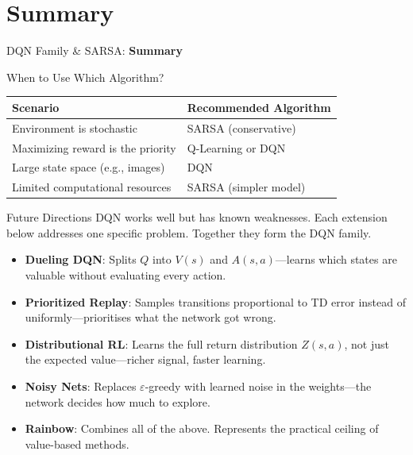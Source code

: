 \section{Summary}
\begin{frame}{}
    \LARGE DQN Family \& SARSA: \textbf{Summary}
\end{frame}

\begin{frame}{When to Use Which Algorithm?}
    \begin{table}[]
        \centering
        \renewcommand{\arraystretch}{2.5}
        \begin{tabular}{ll}
            \hline
            \textbf{Scenario} & \textbf{Recommended Algorithm} \\ \hline
            Environment is stochastic & SARSA (conservative) \\ 
            Maximizing reward is the priority & Q-Learning or DQN \\ 
            Large state space (e.g., images) & DQN \\ 
            Limited computational resources & SARSA (simpler model) \\ \hline
        \end{tabular}
    \end{table}
\end{frame}

\begin{frame}{Future Directions}
    \small
    DQN works well but has known weaknesses. Each extension below addresses one specific problem. Together they form the DQN family.
    \begin{itemize}
        \setlength{\itemsep}{0.4em}
        \item \textbf{Dueling DQN}: Splits $Q$ into $V(s)$ and $A(s,a)$---learns which states are valuable without evaluating every action.
        \item \textbf{Prioritized Replay}: Samples transitions proportional to TD error instead of uniformly---prioritises what the network got wrong.
        \item \textbf{Distributional RL}: Learns the full return distribution $Z(s,a)$, not just the expected value---richer signal, faster learning.
        \item \textbf{Noisy Nets}: Replaces $\varepsilon$-greedy with learned noise in the weights---the network decides how much to explore.
        \item \textbf{Rainbow}: Combines all of the above. Represents the practical ceiling of value-based methods.
    \end{itemize}
\end{frame}

